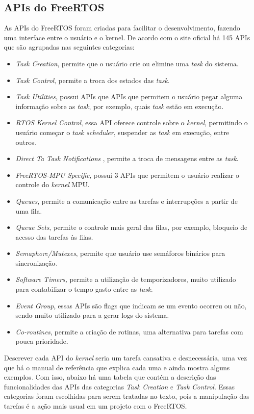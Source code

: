 \subsection{APIs do FreeRTOS}

As APIs do FreeRTOS foram criadas para facilitar o desenvolvimento, fazendo uma interface entre o usuário e o kernel. De acordo com o site oficial há 145 APIs que são agrupadas nas seguintes categorias:

\begin{itemize}
\item\textit{Task Creation}, permite que o usuário crie ou elimine uma \textit{task} do sistema.
\item\textit{Task Control}, permite a troca dos estados das \textit{task}.
\item\textit{Task Utilities}, possui APIs que APIs que permitem o usuário pegar alguma informação sobre as \textit{task}, por exemplo, quais \textit{task} estão em execução.
\item\textit{RTOS Kernel Control}, essa API oferece controle sobre o \textit{kernel}, permitindo o usuário começar o \textit{task scheduler},  suspender as \textit{task} em execução, entre outros.
\item\textit{Direct To Task Notifications} , permite a troca de mensagens entre as \textit{task}.
\item\textit{FreeRTOS-MPU Specific}, possui 3 APIs que permitem o usuário realizar o controle do \textit{kernel} MPU.
\item\textit{Queues}, permite a comunicação entre as tarefas e interrupções a partir de uma fila.
\item\textit{Queue Sets}, permite o controle mais geral das filas, por exemplo, bloqueio de acesso das tarefas às filas.
\item\textit{Semaphore/Mutexes}, permite que usuário use semáforos binários para sincronização.
\item\textit{Software Timers,} permite a utilização de temporizadores, muito utilizado para contabilizar o tempo gasto entre as \textit{task}.
\item\textit{Event Group}, essas APIs são flags que indicam se um evento ocorreu ou não, sendo muito utilizado para a gerar logs do sistema.
\item\textit{Co-routines}, permite a criação de rotinas, uma alternativa para tarefas com pouca prioridade.
\end{itemize}

Descrever cada API do \textit{kernel} seria um tarefa cansativa e desnecessária, uma vez que há o manual de referência que explica cada uma e ainda mostra alguns exemplos. Com isso, abaixo há uma tabela que contém a descrição das funcionalidades das APIs das categorias \textit{Task Creation} e \textit{Task Control}. Essas categorias foram escolhidas para serem tratadas no texto, pois a manipulação das tarefas é a ação mais usual em um projeto com o FreeRTOS.

